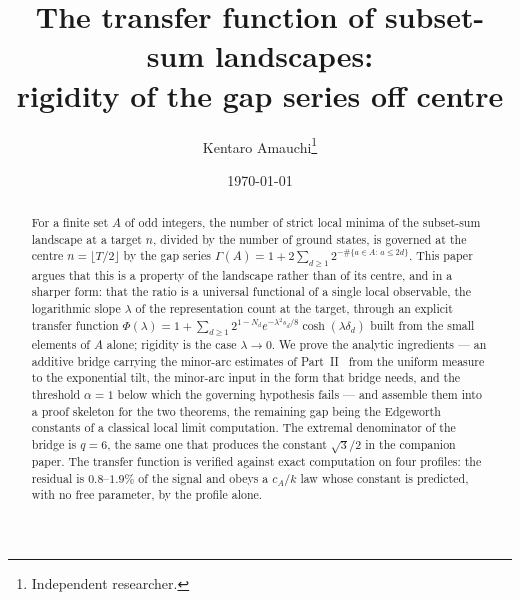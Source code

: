 \documentclass[11pt,a4paper]{article}
\title{The transfer function of subset-sum landscapes:\\
rigidity of the gap series off centre}
\author{Kentaro Amauchi\thanks{Independent researcher.}}
\date{\today}
\theoremstyle{plain}
\theoremstyle{definition}
\theoremstyle{remark}
\begin{document}
\maketitle

\begin{center}
\end{center}

\vspace{1em}

\begin{abstract}
For a finite set $A$ of odd integers, the number of strict local minima of the subset-sum
landscape at a target $n$, divided by the number of ground states, is governed at the centre
$n=\lfloor T/2\rfloor$ by the gap series
$\Gamma(A)=1+2\sum_{d\ge1}2^{-\#\{a\in A:\,a\le2d\}}$. This paper argues that
this is a property of the landscape rather than of its centre, and in a sharper form: that the
ratio is a universal functional of a single local observable, the logarithmic slope $\lambda$
of the representation count at the target, through an explicit transfer function
$\Phi(\lambda)=1+\sum_{d\ge1}2^{1-N_d}e^{-\lambda^{2}s_d/8}\cosh(\lambda\delta_d)$
built from the small elements of $A$ alone; rigidity is the case $\lambda\to0$.
We prove the analytic ingredients --- an additive bridge carrying the minor-arc estimates of
Part~II~\cite{P2} from the uniform measure to the exponential tilt, the minor-arc input in
the form that bridge needs, and the threshold $\alpha=1$ below which the governing hypothesis
fails --- and assemble them into a proof skeleton for the two theorems, the remaining gap
being the Edgeworth constants of a classical local limit computation. The extremal denominator
of the bridge is $q=6$, the same one that produces the constant $\sqrt3/2$ in the companion
paper. The transfer function is verified against exact computation on four profiles: the
residual is $0.8$--$1.9\%$ of the signal and obeys a $c_A/k$ law whose constant is predicted,
with no free parameter, by the profile alone.
\end{abstract}
\end{document}
